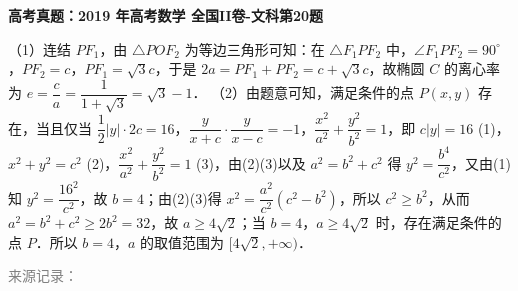 \documentclass[UTF8,a4paper,11pt]{ctexart}
\newenvironment{gaokao}[1]{\par\medskip\noindent\textbf{高考真题：#1}\par\smallskip}{\par\medskip}
\begin{document}
\begin{gaokao}{2019 年高考数学 全国II卷-文科第20题}
（1）连结 $PF_1$，由 $\triangle POF_2$ 为等边三角形可知：在 $\triangle F_1PF_2$ 中，$\angle F_1PF_2=90^\circ$，$PF_2=c$，$PF_1=\sqrt{3}c$，于是 $2a=PF_1+PF_2=c+\sqrt{3}c$，故椭圆 $C$ 的离心率为 $e=\dfrac{c}{a}=\dfrac{1}{1+\sqrt{3}}=\sqrt{3}-1$．
（2）由题意可知，满足条件的点 $P(x,y)$ 存在，当且仅当 $\dfrac{1}{2}|y|\cdot2c=16$，$\dfrac{y}{x+c}\cdot\dfrac{y}{x-c}=-1$，$\dfrac{x^2}{a^2}+\dfrac{y^2}{b^2}=1$，即 $c|y|=16$ (1)，$x^2+y^2=c^2$ (2)，$\dfrac{x^2}{a^2}+\dfrac{y^2}{b^2}=1$ (3)，由(2)(3)以及 $a^2=b^2+c^2$ 得 $y^2=\dfrac{b^4}{c^2}$，又由(1)知 $y^2=\dfrac{16^2}{c^2}$，故 $b=4$；由(2)(3)得 $x^2=\dfrac{a^2}{c^2}(c^2-b^2)$，所以 $c^2\ge b^2$，从而 $a^2=b^2+c^2\ge 2b^2=32$，故 $a\ge 4\sqrt{2}$；当 $b=4$，$a\ge 4\sqrt{2}$ 时，存在满足条件的点 $P$．所以 $b=4$，$a$ 的取值范围为 $[4\sqrt{2},+\infty)$．

\par\smallskip\textcolor{gray}{\footnotesize 来源记录：\texttt{}}

\end{gaokao}
\end{document}
